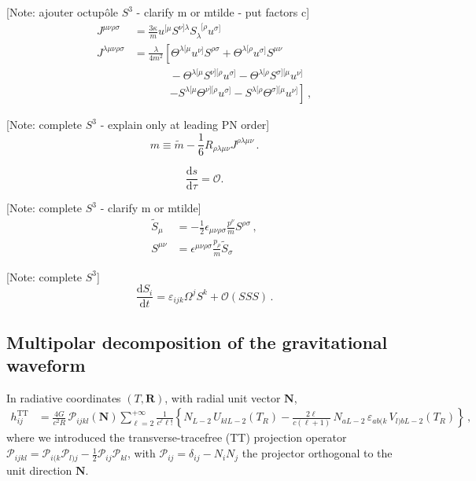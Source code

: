 \documentclass[
superscriptaddress,
preprint,
prd,tightenlines,showpacs,nofootinbib,
eqsecnum,
amsfonts,amsmath,amssymb]{revtex4-1}
\newcommand{\ud}{\mathrm{d}}
\newcommand{\calO}{\mathcal{O}}
\newcommand{\ph}[1]{\phantom{#1}}
\newcommand{\be}{\begin{equation}}
\newcommand{\ee}{\end{equation}}
\newcommand{\nn}{\nonumber}
\begin{document}
[Note: ajouter octupôle $S^3$ - clarify m or mtilde - put factors c]
\begin{subequations}
\begin{align}
	J^{\mu\nu\rho\sigma} &= \frac{3 \kappa}{m}u^{[\mu}S^{\nu]\lambda}S_{\lambda}^{\ph{\lambda}[\rho}u^{\sigma]} \\
	J^{\lambda\mu\nu\rho\sigma} &= \frac{\lambda}{4 m^{2}} \left[ \Theta^{\lambda[\mu}u^{\nu]}S^{\rho\sigma} + \Theta^{\lambda[\rho}u^{\sigma]}S^{\mu\nu} \right.\nn\\
	& \qquad \quad \; - \Theta^{\lambda[\mu}S^{\nu][\rho}u^{\sigma]} - \Theta^{\lambda[\rho}S^{\sigma][\mu}u^{\nu]} \nn\\
	&\qquad \quad \; \left. - S^{\lambda[\mu}\Theta^{\nu][\rho}u^{\sigma]} - S^{\lambda[\rho}\Theta^{\sigma][\mu}u^{\nu]} \right] \,,
\label{eq:Jdef}
\end{align}
\end{subequations}

[Note: complete $S^3$ - explain only at leading PN order]
\be \label{eq:defm}
	m \equiv \tilde{m} - \frac{1}{6}R_{\rho\lambda\mu\nu} J^{\rho\lambda\mu\nu} \,. 
\ee

\be \label{eq:norms}
	\frac{\ud s}{\ud \tau} = \calO. 
\ee

[Note: complete $S^3$ - clarify m or mtilde]
\begin{subequations}\label{eq:defscovector}
\begin{align}
	\tilde{S}_{\mu} &= - \frac{1}{2} \epsilon_{\mu\nu\rho\sigma}\frac{p^{\nu}}{m}S^{\rho\sigma} \,, \\ 
	S^{\mu\nu} &= \epsilon^{\mu\nu\rho\sigma}\frac{p_{\rho}}{m} \tilde{S}_{\sigma} 
\end{align}
\end{subequations}

[Note: complete $S^3$]
\be
	\frac{{\mathrm d}S_{i}}{{\mathrm d}t} = \varepsilon_{ijk} \Omega^{j}
S^{k}+ \calO(SSS) \,.
\ee


\subsection{Multipolar decomposition of the gravitational waveform}
\label{subsec:summarymultipoles}

In radiative coordinates $(T, \bm{R})$, with radial unit vector $\bm{N}$,
\begin{align}\label{eq:hij}
h_{ij}^\text{TT} &= \frac{4G}{c^2R} \,\mathcal{P}_{ijkl} (\bm{N}) \sum^{+\infty}_{\ell=2}\frac{1}{c^\ell \ell !} \left\{ N_{L-2} \,U_{klL-2}(T_R) - \frac{2\ell}{c(\ell+1)} \,N_{aL-2} \,\varepsilon_{ab(k} \,V_{l)bL-2}(T_R)\right\} \,,
\end{align}
where we introduced the transverse-tracefree (TT) projection operator $\mathcal{P}_{ijkl} = \mathcal{P}_{i(k}\mathcal{P}_{l)j}-\frac{1}{2}\mathcal{P}_{ij}\mathcal{P}_{kl}$, with $\mathcal{P}_{ij}=\delta_{ij}-N_iN_j$ the projector orthogonal to the unit direction $\bm{N}$.
\end{document}
